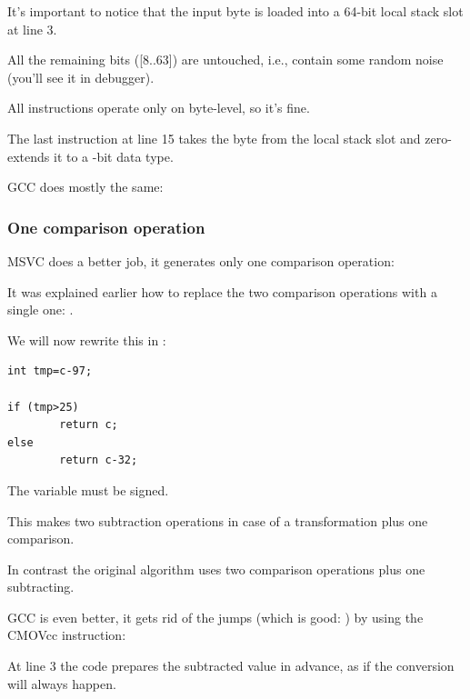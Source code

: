 It's important to notice that the input byte is loaded into a 64-bit local stack slot at line 3.

All the remaining bits ([8..63]) are untouched, i.e., contain some random noise (you'll see it in debugger).

All instructions operate only on byte-level, so it's fine.

The last  instruction at line 15 takes the byte from the local stack slot and zero-extends it to a -bit data type.

\NonOptimizing GCC does mostly the same:



\subsubsection{One comparison operation}
\label{toupper_one_comparison}

\Optimizing MSVC does a better job, it generates only one comparison operation:



It was explained earlier how to replace the two comparison operations with a single one: .

We will now rewrite this in \CCpp:

\begin{lstlisting}[style=customc]
int tmp=c-97;

if (tmp>25)
        return c;
else
        return c-32;
\end{lstlisting}

The  variable must be signed.

This makes two subtraction operations in case of a transformation plus one comparison.

In contrast the original algorithm uses two comparison operations plus one subtracting.

\Optimizing GCC is even better, it gets rid of the jumps (which is good: ) 
by using the CMOVcc instruction:



At line 3 the code prepares the subtracted value in advance, as if the conversion will always happen.

